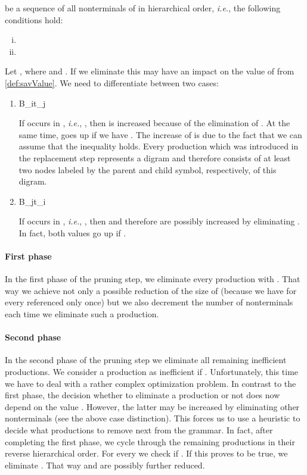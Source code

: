 \documentclass[12pt]{llncs}
\newcommand{\tp}{digram\xspace}
\newcommand{\hairsp}{\hspace{1pt}}\newcommand{\TODO}{\textcolor{red}{\bf TODO!}\xspace}
\newcommand{\ie}{\mbox{\textit{i.\hairsp{}e.}}\xspace}
\begin{document}
be a sequence of all nonterminals of  in hierarchical order, \ie, the following conditions hold:
\begin{enumerate}[(i)]
	\item 
	\item 
\end{enumerate}
Let , where  and . If we eliminate  this may have an impact on the value of
 from \eqref{def:savValue}. We need to differentiate between two cases:
\begin{enumerate}[(1)]
	\item B_it_j
	
		If  occurs in , \ie, , then  is increased because of the elimination of . At the same time,  goes up if we have . The increase of  is due to the fact that we can assume that the inequality  holds. Every production which was introduced in the replacement step represents a \tp and therefore consists of at least two nodes labeled by the parent and child symbol, respectively, of this \tp.
	\item B_jt_i
	
		If  occurs in , \ie, , then  and therefore  are possibly increased by eliminating . In fact, both values go up if .
\end{enumerate}

\paragraph*{First phase} In the first phase of the pruning step, we eliminate every production  with . That way we achieve not only a possible reduction of the size of  (because we have  for every  referenced only once) but we also decrement the number of nonterminals  each time we eliminate such a production.

\paragraph*{Second phase} In the second phase of the pruning step we eliminate all remaining inefficient productions. We consider a production  as inefficient if . 
Unfortunately, this time we have to deal with a rather complex optimization problem. In contrast to the first phase, the decision whether to eliminate a production  or not does now depend on the value . However, the latter may be increased by eliminating other nonterminals (see the above case distinction). This forces us to use a heuristic to decide what productions to remove next from the grammar. In fact, after completing the first phase, we cycle through the remaining productions in their reverse hierarchical order. For every  we check if . If this proves to be true, we eliminate . That way  and  are possibly further reduced.
\end{document}
